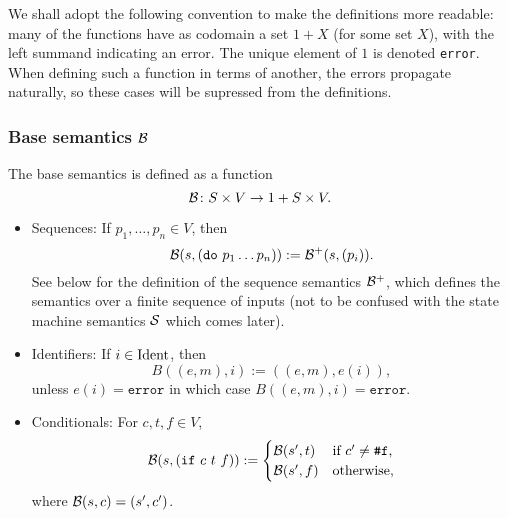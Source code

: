 We shall adopt the following convention to make the definitions more readable:
many of the functions have as codomain a set $1 + X$ (for some set $X$), with
the left summand indicating an error. The unique element of $1$ is denoted
\texttt{error}. When defining such a function in terms of another, the errors
propagate naturally, so these cases will be supressed from the definitions.

\subsubsection{Base semantics $\B$}

The base semantics is defined as a function
\[
\B \colon S \times V \to 1 + S \times V.
\]
\begin{itemize}
\item Sequences: If $p_1, \ldots, p_n \in V$, then
  \[
    \B(s, (\mathtt{do} \ p_1 \ldots p_n)) := \B^+(s, (p_i)).
  \]
  See below for the definition of the sequence semantics $\B^+$, which defines
  the semantics over a finite sequence of inputs (not to be confused with the
  state machine semantics $\S$ which comes later).
\item Identifiers: If $i \in \Ident$, then
  \[
    B((e,m), i) := ((e,m),e(i)),
  \]
  unless $e(i) = \mathtt{error}$ in which case $B((e,m), i) = \mathtt{error}$.
\item Conditionals: For $c,t,f \in V$,
  \[
    \B( s, (\mathtt{if} \ c \ t \ f)) :=
    \begin{cases}
      \B(s', t) & \text{if $c' \neq \texttt{\#}\mathtt{f}$,}\\
      \B(s', f) & \text{otherwise,}
    \end{cases}
  \]
  where $\B(s, c) = (s', c')$.


\end{itemize}
